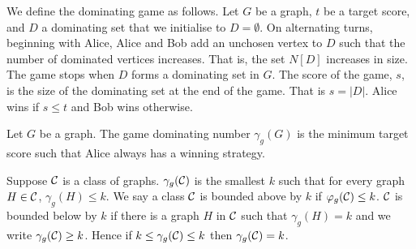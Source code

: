 We define the dominating game as follows. Let $G$ be a graph, $t$ be a target score, and $D$ a dominating set that we initialise to $D=\emptyset$. On alternating turns, beginning with Alice, Alice and Bob add an unchosen vertex to $D$ such that the number of dominated vertices increases. That is, the set $N[D]$ increases in size. The game stops when $D$ forms a dominating set in $G$. The score of the game, $s$, is the size of the dominating set at the end of the game. That is $s=|D|$. Alice wins if $s\leq t$ and Bob wins otherwise.

\begin{definition}
    Let $G$ be a graph. The game dominating number $\gamma_g(G)$ is the minimum target score such that Alice always has a winning strategy.
\end{definition} 

Suppose $\mathcal{C}$ is a class of graphs. $\gamma_g(\mathcal{C})$ is the smallest $k$ such that for every graph $H\in\mathcal{C}$, $\gamma_g(H)\leq k$. We say a class $\mathcal{C}$ is bounded above by $k$ if $\varphi_g(\mathcal{C})\leq k$. $\mathcal{C}$ is bounded below by $k$ if there is a graph $H$ in $\mathcal{C}$ such that $\gamma_g(H)= k$ and we write $\gamma_g(\mathcal{C})\geq k$. Hence if $k\leq\gamma_g(\mathcal{C})\leq k$ then $\gamma_g(\mathcal{C}) = k$. 



%        
%
%    
%
%
%
%
%    

